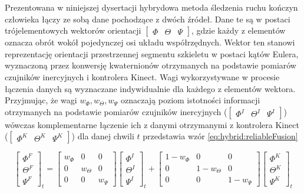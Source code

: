 Prezentowana w niniejszej dysertacji hybrydowa metoda śledzenia ruchu kończyn człowieka łączy ze sobą dane pochodzące z dwóch źródeł. Dane te są w postaci trójelementowych wektorów orientacji $\begin{bmatrix}  \Phi &  \Theta & \Psi \end{bmatrix}$, gdzie każdy z elementów oznacza obrót wokół pojedynczej osi układu współrzędnych. Wektor ten stanowi reprezentację orientacji przestrzennej segmentu szkieletu w postaci kątów Eulera, wyznaczoną przez konwersję kwaternionów otrzymanych na podstawie pomiarów czujników inercyjnych i kontrolera Kinect. Wagi wykorzystywane w procesie łączenia danych są wyznaczane indywidualnie dla każdego z elementów wektora. Przyjmując, że wagi $w_\Phi , w_\Theta , w_\Psi$ oznaczają poziom istotności informacji otrzymanych na podstawie pomiarów czujników inercyjnych ($\begin{bmatrix}  \Phi^I &  \Theta^I &  \Psi^I \end{bmatrix}$) wówczas komplementarne łączenie ich z danymi otrzymanymi z kontrolera Kinect ($\begin{bmatrix}  \Phi^K &  \Theta^K &  \Psi^K \end{bmatrix}$) dla danej chwili $t$ przedstawia wzór \eqref{eq:hybrid:reliableFusion}

\begin{equation}
	\begin{bmatrix}  \Phi^F \\  \Theta^F \\  \Psi^F \end{bmatrix}_t = 
	\begin{bmatrix}  w_\Phi&0&0 \\  0&w_\Theta&0 \\  0&0&w_\Psi \end{bmatrix}
	\begin{bmatrix}  \Phi^I \\  \Theta^I \\  \Psi^I \end{bmatrix}_t + 
	\begin{bmatrix}  1-w_\Phi&0&0 \\  0&1-w_\Theta&0 \\  0&0&1-w_\Psi \end{bmatrix}
	\begin{bmatrix}  \Phi^K \\  \Theta^K \\  \Psi^K \end{bmatrix}_t
	\label{eq:hybrid:reliableFusion}
\end{equation}

